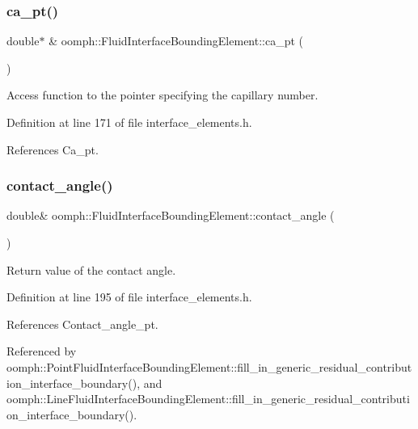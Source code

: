 \subsubsection{\texorpdfstring{ca\+\_\+pt()}{ca\_pt()}}
{\footnotesize\ttfamily double$\ast$ \& oomph\+::\+Fluid\+Interface\+Bounding\+Element\+::ca\+\_\+pt (\begin{DoxyParamCaption}{ }\end{DoxyParamCaption})\hspace{0.3cm}{\ttfamily [inline]}}



Access function to the pointer specifying the capillary number. 



Definition at line 171 of file interface\+\_\+elements.\+h.



References Ca\+\_\+pt.

\mbox{\label{classoomph_1_1FluidInterfaceBoundingElement_a6803f4ea8de0b3fe17b703d7489c8147}} 
\subsubsection{\texorpdfstring{contact\+\_\+angle()}{contact\_angle()}}
{\footnotesize\ttfamily double\& oomph\+::\+Fluid\+Interface\+Bounding\+Element\+::contact\+\_\+angle (\begin{DoxyParamCaption}{ }\end{DoxyParamCaption})\hspace{0.3cm}{\ttfamily [inline]}}



Return value of the contact angle. 



Definition at line 195 of file interface\+\_\+elements.\+h.



References Contact\+\_\+angle\+\_\+pt.



Referenced by oomph\+::\+Point\+Fluid\+Interface\+Bounding\+Element\+::fill\+\_\+in\+\_\+generic\+\_\+residual\+\_\+contribution\+\_\+interface\+\_\+boundary(), and oomph\+::\+Line\+Fluid\+Interface\+Bounding\+Element\+::fill\+\_\+in\+\_\+generic\+\_\+residual\+\_\+contribution\+\_\+interface\+\_\+boundary().

